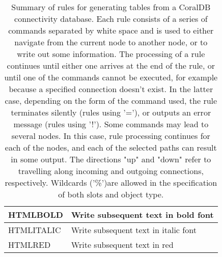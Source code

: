 \begin{table}[tbp]
\begin{center}
\begin{tabular}{|l|l|}
HTMLBOLD & Write subsequent text in bold font \\ \hline
HTMLITALIC & Write subsequent text in italic font \\ \hline
HTMLRED & Write subsequent text in red \\ \hline
\end{tabular}
\caption[Rules for generating tables]
{Summary of rules for generating tables from a CoralDB connectivity
database. Each rule consists of a series of commands separated by
white space and is used to either navigate from the current
node to another node, or to write out some information.
The processing of a rule continues until either one arrives at
the end of the rule, or until one of the commands cannot be executed,
for example because a specified connection doesn't exist. In the
latter case, depending on the form of the command used, the rule
terminates silently (rules using '='), or outputs an error message
(rules using '!'). Some commands may lead to several nodes. In this case, rule processing
continues for each of the nodes, and each of the selected paths can
result in some output.
The directions "up" and "down" refer to travelling along incoming and outgoing connections, respectively.
Wildcards ('\%')are allowed in the specification of both slots and object type.}
\label{CORALDBRULES}
\end{center}
\end{table}


